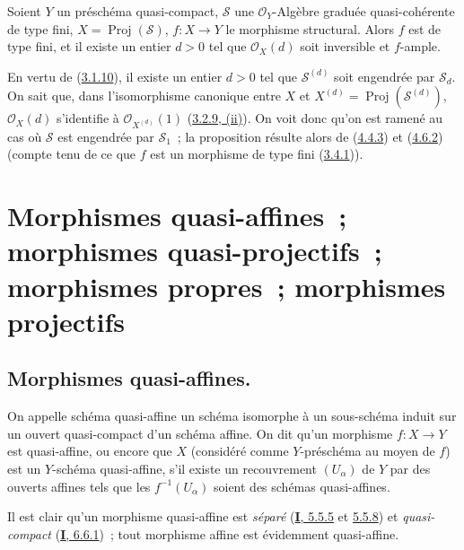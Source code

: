 \begin{proposition}[4.6.18]
\label{II.4.6.18-fr}
Soient $Y$ un préschéma quasi-compact, $\mathcal{S}$ une
$\mathcal{O}_Y$-Algèbre graduée quasi-cohérente de type fini,
$X=\operatorname{Proj}(\mathcal{S})$, $f:X\to Y$ le morphisme structural.
Alors $f$ est de type fini, et il existe un entier $d>0$ tel que
$\mathcal{O}_X(d)$ soit inversible et $f$-ample.
\end{proposition}

En vertu de (\hyperref[II.3.1.10-fr]{3.1.10}), il existe un entier $d>0$
tel que $\mathcal{S}^{(d)}$ soit engendrée par $\mathcal{S}_d$. On sait que,
dans l'isomorphisme canonique entre $X$ et
$X^{(d)}=\operatorname{Proj}(\mathcal{S}^{(d)})$, $\mathcal{O}_X(d)$
s'identifie à $\mathcal{O}_{X^{(d)}}(1)$
(\hyperref[II.3.2.9-fr]{3.2.9, (ii)}). On voit donc qu'on est ramené au cas
où $\mathcal{S}$ est engendrée par $\mathcal{S}_1$~; la proposition résulte
alors de (\hyperref[II.4.4.3-fr]{4.4.3}) et
(\hyperref[II.4.6.2-fr]{4.6.2}) (compte tenu de ce que $f$ est un morphisme
de type fini (\hyperref[II.3.4.1-fr]{3.4.1})).

\section{Morphismes quasi-affines~; morphismes quasi-projectifs~; morphismes
propres~; morphismes projectifs}
\label{section:II.5-fr}

\subsection{Morphismes quasi-affines.}
\label{subsection:II.5.1-fr}

\begin{definition}[5.1.1]
\label{II.5.1.1-fr}
On appelle schéma quasi-affine un schéma isomorphe à un sous-schéma
induit sur un ouvert quasi-compact d'un schéma affine. On dit qu'un morphisme
$f:X\to Y$ est quasi-affine, ou encore que $X$ (considéré comme
$Y$-préschéma au moyen de $f$) est un $Y$-schéma quasi-affine, s'il
existe un recouvrement $(U_\alpha)$ de $Y$ par des ouverts affines tels que
les $f^{-1}(U_\alpha)$ soient des schémas quasi-affines.
\end{definition}

Il est clair qu'un morphisme quasi-affine est \emph{séparé}
(\hyperref[I.5.5.5-fr]{\textbf{I}, 5.5.5} et \hyperref[I.5.5.8-fr]{5.5.8}) et
\emph{quasi-compact} (\hyperref[I.6.6.1-fr]{\textbf{I}, 6.6.1})~; tout morphisme
affine est évidemment quasi-affine.


